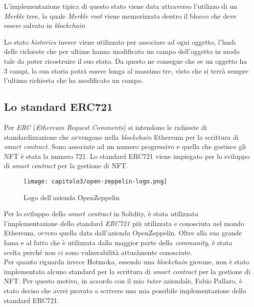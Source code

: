 L'implementazione tipica di questo stato viene data attraverso l'utilizzo di un \textit{Merkle} tree, la quale \textit{Merkle root} viene memorizzata dentro il blocco che deve essere salvato in \textit{blockchain}

Lo stato \textit{histories} invece viene utilizzato per associare ad ogni oggetto, l'hash delle richieste che per ultime hanno modificato un campo dell'oggetto in modo tale da poter ricostruire il suo stato. Da questo ne consegue che se un oggetto ha 3 campi, la sua storia potrà essere lunga al massimo tre, visto che si terrà sempre l'ultima richiesta che ha modificato un campo.


\subsection{Lo standard ERC721}
Per \textit{ERC} (\textit{Ethereum Request Comments}) si intendono le richieste di standardizzazione che avvengono nella \textit{blockchain} Ethereum per la scrittura di \textit{smart contract}. Sono associate ad un numero progressivo e quella che gestisce gli NFT è stata la numero 721. Lo standard ERC721 viene impiegato per lo sviluppo di \textit{smart contract} per la gestione di NFT. \\

\begin{figure}[h!]
  \centering
  \texttt{[image: capitolo3/open-zeppelin-logo.png]}
  \caption{Logo dell'azienda OpenZeppelin}
\end{figure}

Per lo sviluppo dello \textit{smart contract} in Solidity, è stata utilizzata l'implementazione dello standard \textit{ERC721} più utilizzata e conosciuta nel mondo Ethereum, ovvero quella data dall'azienda OpenZeppelin. Oltre alla sua grande fama e al fatto che è utilizzata dalla maggior parte della \textit{community}, è stata scelta perché non ci sono vulnerabilità attualmente conosciute. \\

Per quanto riguarda invece Hotmoka, essendo una \textit{blockchain} giovane, non è stato implementato alcuno standard per la scrittura di \textit{smart contract} per la gestione di NFT. Per questo motivo, in accordo con il mio \textit{tutor} aziendale, Fabio Pallaro, è stato deciso che avrei provato a scrivere una mia possibile implementazione dello standard ERC721.

